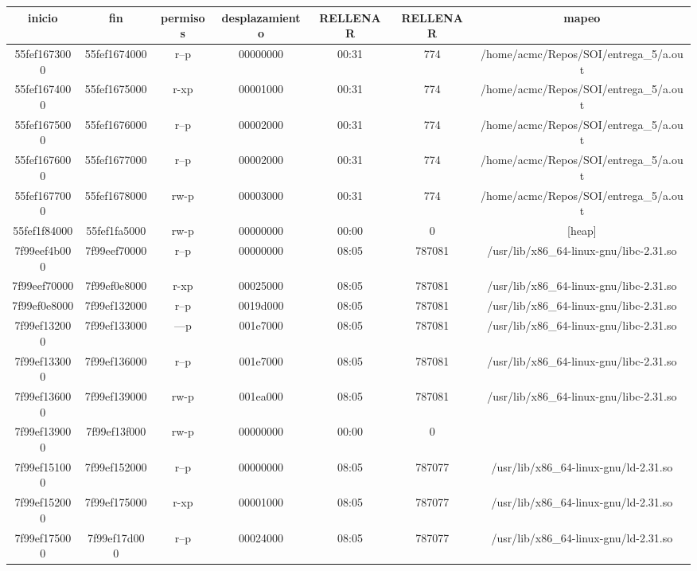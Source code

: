 \documentclass[a4paper]{article}
\begin{document}
\begin{center}
\def\arraystretch{1.5}
\begin{tabular}{ | c | c | c | c | c | c | c | }
    \hline
     inicio & fin & permisos & desplazamiento & RELLENAR & RELLENAR &mapeo \\ \hline
     55fef1673000 & 55fef1674000 & r--p & 00000000 & 00:31 & 774 & /home/acmc/Repos/SOI/entrega\_5/a.out \\ \hline
55fef1674000 & 55fef1675000 & r-xp & 00001000 & 00:31 & 774 & /home/acmc/Repos/SOI/entrega\_5/a.out \\ \hline
55fef1675000 & 55fef1676000 & r--p & 00002000 & 00:31 & 774 & /home/acmc/Repos/SOI/entrega\_5/a.out \\ \hline
55fef1676000 & 55fef1677000 & r--p & 00002000 & 00:31 & 774 & /home/acmc/Repos/SOI/entrega\_5/a.out \\ \hline
55fef1677000 & 55fef1678000 & rw-p & 00003000 & 00:31 & 774 & /home/acmc/Repos/SOI/entrega\_5/a.out \\ \hline
55fef1f84000 & 55fef1fa5000 & rw-p & 00000000 & 00:00 & 0 & [heap] \\ \hline
7f99eef4b000 & 7f99eef70000 & r--p & 00000000 & 08:05 & 787081 & /usr/lib/x86\_64-linux-gnu/libc-2.31.so \\ \hline
7f99eef70000 & 7f99ef0e8000 & r-xp & 00025000 & 08:05 & 787081 & /usr/lib/x86\_64-linux-gnu/libc-2.31.so \\ \hline
7f99ef0e8000 & 7f99ef132000 & r--p & 0019d000 & 08:05 & 787081 & /usr/lib/x86\_64-linux-gnu/libc-2.31.so \\ \hline
7f99ef132000 & 7f99ef133000 & ---p & 001e7000 & 08:05 & 787081 & /usr/lib/x86\_64-linux-gnu/libc-2.31.so \\ \hline
7f99ef133000 & 7f99ef136000 & r--p & 001e7000 & 08:05 & 787081 & /usr/lib/x86\_64-linux-gnu/libc-2.31.so \\ \hline
7f99ef136000 & 7f99ef139000 & rw-p & 001ea000 & 08:05 & 787081 & /usr/lib/x86\_64-linux-gnu/libc-2.31.so \\ \hline
7f99ef139000 & 7f99ef13f000 & rw-p & 00000000 & 00:00 & 0 &  \\ \hline
7f99ef151000 & 7f99ef152000 & r--p & 00000000 & 08:05 & 787077 & /usr/lib/x86\_64-linux-gnu/ld-2.31.so \\ \hline
7f99ef152000 & 7f99ef175000 & r-xp & 00001000 & 08:05 & 787077 & /usr/lib/x86\_64-linux-gnu/ld-2.31.so \\ \hline
7f99ef175000 & 7f99ef17d000 & r--p & 00024000 & 08:05 & 787077 & /usr/lib/x86\_64-linux-gnu/ld-2.31.so \\ \hline

\end{tabular}
\end{center}
\end{document}
